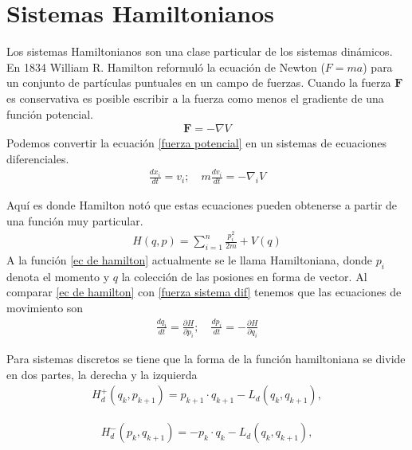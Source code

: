 \section{Sistemas Hamiltonianos}
Los sistemas Hamiltonianos son una clase particular de los sistemas dinámicos. En 1834 William R. Hamilton reformuló la ecuación de Newton ($F=ma$) para un conjunto de partículas puntuales en un campo de fuerzas. Cuando la fuerza $\mathbf{F}$ es conservativa es posible escribir a la fuerza como  menos el gradiente de una función potencial. 
\begin{eqnarray}
\mathbf{F}=-\nabla V \label{fuerza potencial}
\end{eqnarray}
Podemos convertir la ecuación \ref{fuerza potencial} en un sistemas de ecuaciones diferenciales.
\begin{eqnarray}
\frac{dx_{i}}{dt}=v_{i};   \quad m\frac{dv_{i}}{dt}=-\nabla_{i} V
\label{fuerza sistema dif}
\end{eqnarray}

Aquí es donde Hamilton notó que estas ecuaciones pueden obtenerse a partir de una función muy particular.
\begin{eqnarray}
H(q,p)=\sum_{i=1}^{n} \frac{p_{i}^{2}}{2m}+V(q) \label{ec de hamilton}
\end{eqnarray}
A la función \ref{ec de hamilton} actualmente se le llama Hamiltoniana, donde $p_{i}$ denota el momento y \textbf{$q$} la colección de las posiones en forma de vector. Al comparar \ref{ec de hamilton} con \ref{fuerza sistema dif} tenemos que las ecuaciones de movimiento son
\begin{eqnarray}
\frac{dq_{i}}{dt}=\frac{\partial H}{\partial p_{i}}; \quad
\frac{dp_{i}}{dt}=-\frac{\partial H}{\partial q_{i}}
\label{ec de mov hamilton}
\end{eqnarray}



Para sistemas discretos se tiene que la forma de la función hamiltoniana se divide en dos partes, la derecha y la izquierda
\begin{eqnarray}
H_{d}^{+}(q_{k},p_{k+1})=p_{k+1}\cdot q_{k+1}-L_{d}(q_{k},q_{k+1}),
\label{hamiltoniano discreto derecho}
\end{eqnarray}

\begin{eqnarray}
H_{d}^{-}(p_{k},q_{k+1})=-p_{k}\cdot q_{k}-L_{d}(q_{k},q_{k+1}),
\label{hamiltoniano discreto izquierdo}
\end{eqnarray}

